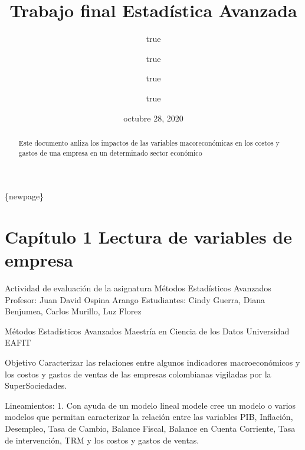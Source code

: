 \documentclass[
  11pt,
]{article}
\title{Trabajo final Estadística Avanzada}
\author{true \and true \and true \and true}
\date{octubre 28, 2020}
\begin{document}
\maketitle
\begin{abstract}
Este documento anliza los impactos de las variables macoreconómicas en
los costos y gastos de una empresa en un determinado sector económico
\end{abstract}

{
\setcounter{tocdepth}{3}
\tableofcontents
}
\{newpage\}

\hypertarget{capuxedtulo-1-lectura-de-variables-de-empresa}{%
\section{Capítulo 1 Lectura de variables de
empresa}\label{capuxedtulo-1-lectura-de-variables-de-empresa}}

Actividad de evaluación de la asignatura Métodos Estadísticos Avanzados
Profesor: Juan David Ospina Arango Estudiantes: Cindy Guerra, Diana
Benjumea, Carlos Murillo, Luz Florez

Métodos Estadísticos Avanzados Maestría en Ciencia de los Datos
Universidad EAFIT

Objetivo Caracterizar las relaciones entre algunos indicadores
macroeconómicos y los costos y gastos de ventas de las empresas
colombianas vigiladas por la SuperSociedades.

Lineamientos: 1. Con ayuda de un modelo lineal modele cree un modelo o
varios modelos que permitan caracterizar la relación entre las variables
PIB, Inflación, Desempleo, Tasa de Cambio, Balance Fiscal, Balance en
Cuenta Corriente, Tasa de intervención, TRM y los costos y gastos de
ventas.
\end{document}
